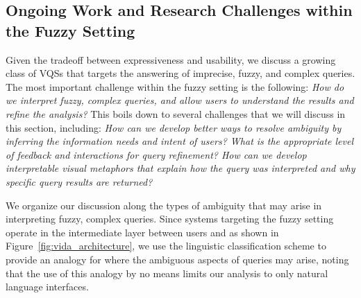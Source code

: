 
\subsection{Ongoing Work and Research Challenges within the Fuzzy Setting}
\par Given the tradeoff between 
expressiveness and usability, 
we discuss a growing class of VQSs 
that targets the 
answering of imprecise, fuzzy, and complex queries.
The most important challenge within the fuzzy
setting is the following:
{\em How do we interpret fuzzy, complex queries,
and allow users to understand the results and refine
the analysis?}
This boils down to several challenges 
that we will discuss in this section,
including:
{\em How can we develop better ways to
 resolve ambiguity by inferring 
 the information needs and 
 intent of users? 
 What is the appropriate level 
 of feedback and interactions for query refinement? 
 How can we develop interpretable 
 visual metaphors that explain how the query 
 was interpreted and why specific query results are returned?} 

We organize our discussion along the 
types of ambiguity that may arise  
in interpreting fuzzy, complex queries. 
Since systems 
targeting the fuzzy setting 
operate in the intermediate layer 
between users and \vidaql 
as shown in Figure~\ref{fig:vida_architecture}, 
we use the linguistic classification scheme 
to provide an analogy for where the ambiguous 
aspects of queries may arise, 
noting that the use of this analogy 
by no means limits our analysis to only natural language interfaces.


